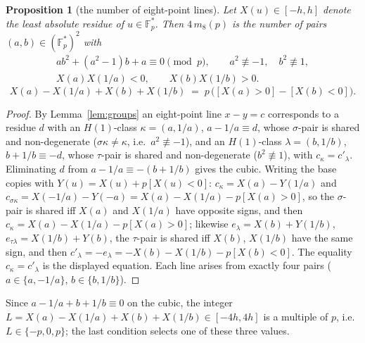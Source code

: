\documentclass[11pt]{article}
\newtheorem{proposition}[theorem]{Proposition}
\theoremstyle{remark}
\newcommand{\Fp}{\mathbb{F}_p}
\begin{document}
\begin{proposition}[the number of eight-point lines]\label{prop:m8}
Let $X(u)\in[-h,h]$ denote the least absolute residue of $u\in\Fp^*$.  Then $4\,m_8(p)$ is the number of pairs $(a,b)\in(\Fp^*)^2$ with
\[
\begin{gathered} ab^2+(a^2-1)b+a\equiv0\pmod p,\qquad a^2\not\equiv-1,\quad b^2\not\equiv1,\\ X(a)X(1/a)<0,\qquad X(b)X(1/b)>0.\end{gathered}
\]
\[
 X(a)-X(1/a)+X(b)+X(1/b)\;=\;p\,\bigl([X(a)>0]-[X(b)<0]\bigr).
\]
\end{proposition}
\begin{proof}
By Lemma~\ref{lem:groups} an eight-point line $x-y=c$ corresponds to a residue $d$ with an $H(1)$-class $\kappa=(a,1/a)$, $a-1/a\equiv d$,
whose $\sigma$-pair is shared and non-degenerate ($\sigma\kappa\ne\kappa$, i.e.\ $a^2\not\equiv-1$), and an $H(1)$-class $\lambda=(b,1/b)$,
$b+1/b\equiv-d$, whose $\tau$-pair is shared and non-degenerate ($b^2\not\equiv1$), with $c_\kappa=c'_\lambda$.  Eliminating $d$ from
$a-1/a\equiv-(b+1/b)$ gives the cubic.  Writing the base copies with $Y(u)=X(u)+p[X(u)<0]$: $c_\kappa=X(a)-Y(1/a)$ and
$c_{\sigma\kappa}=X(-1/a)-Y(-a)=X(a)-X(1/a)-p[X(a)>0]$, so the $\sigma$-pair is shared iff $X(a)$ and $X(1/a)$ have opposite signs, and then
$c_\kappa=X(a)-X(1/a)-p[X(a)>0]$; likewise $e_\lambda=X(b)+Y(1/b)$, $e_{\tau\lambda}=X(1/b)+Y(b)$, the $\tau$-pair is shared iff $X(b)$, $X(1/b)$
have the same sign, and then $c'_\lambda=-e_\lambda=-X(b)-X(1/b)-p[X(b)<0]$.  The equality $c_\kappa=c'_\lambda$ is the displayed equation.
Each line arises from exactly four pairs ($a\in\{a,-1/a\}$, $b\in\{b,1/b\}$).
\end{proof}
Since $a-1/a+b+1/b\equiv0$ on the cubic, the integer $L=X(a)-X(1/a)+X(b)+X(1/b)\in[-4h,4h]$ is a multiple of $p$, i.e.\ $L\in\{-p,0,p\}$;
the last condition selects one of these three values.
\end{document}
